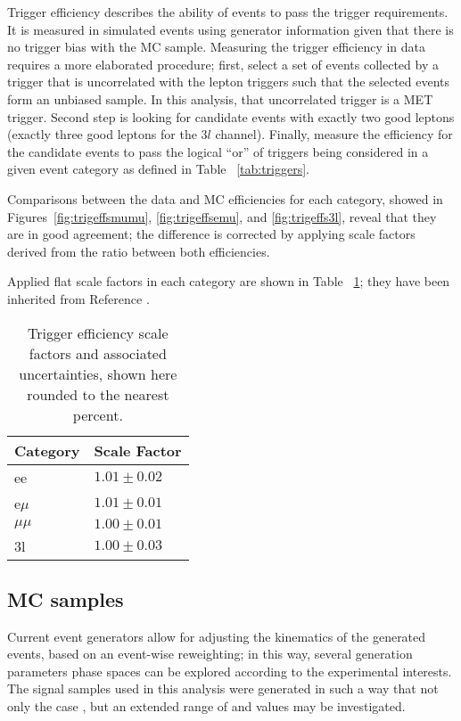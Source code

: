 Trigger efficiency describes the ability of events to pass the trigger requirements. It is measured in simulated events using generator information given that there is no trigger bias with the MC sample. Measuring the trigger efficiency in data requires a more elaborated procedure; first, select a set of events collected by a trigger that is uncorrelated with the lepton triggers such that the selected events form an unbiased sample. In this analysis, that uncorrelated trigger is a MET trigger. Second step is looking for candidate events with exactly two good leptons (exactly three good leptons for the $3l$ channel). Finally,  measure the efficiency for the candidate events to pass the logical ``or'' of triggers being considered in a given event category as defined in Table ~\ref{tab:triggers}.

Comparisons between the data and MC efficiencies for each category, showed in Figures~\ref{fig:trigeffsmumu}, \ref{fig:trigeffsemu}, and \ref{fig:trigeffs3l}, reveal that they are in good agreement; the difference is corrected by applying scale factors derived from the ratio between both efficiencies.

Applied flat scale factors in each category are shown in Table ~\ref{tab:trigSFs}; they have been inherited from Reference \cite{CMS_AN_2017-029}. 
\begin{table}
\centering
\begin{tabular}{ll}
Category & Scale Factor \\\hline
    ee   & $1.01 \pm 0.02$ \\
e$\mu$   & $1.01 \pm 0.01$ \\
$\mu\mu$ & $1.00 \pm 0.01$ \\
3l       & $1.00 \pm 0.03$ \\\hline
\end{tabular}
\caption[Trigger efficiency scale factors and associated uncertainties.]{Trigger efficiency scale factors and associated uncertainties, shown here rounded to the nearest percent.}
\label{tab:trigSFs}
\end{table}

\subsection{MC samples}

Current event generators allow for adjusting the kinematics of the generated events, based on an event-wise reweighting; in this way, several generation parameters phase spaces can be explored according to the experimental interests. The signal samples used in this analysis were generated in such a way that not only the case , but an extended range of \Ct and \CV values may be investigated.


